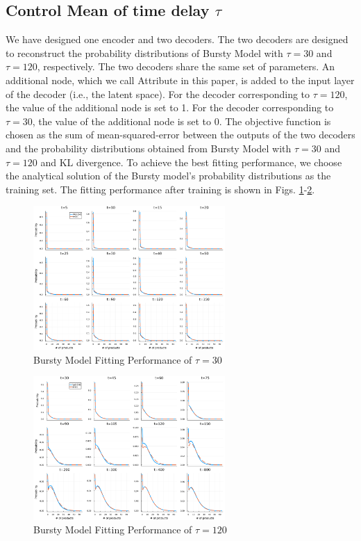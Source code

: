 \documentclass[a4paper,10pt]{article}
\begin{document}
\subsection{Control Mean of time delay $\tau$}
We have designed one encoder and two decoders. The two decoders are designed to reconstruct the probability distributions of Bursty Model with $\tau=30$ and $\tau=120$, respectively. The two decoders share the same set of parameters. An additional node, which we call Attribute in this paper, is added to the input layer of the decoder (i.e., the latent space). For the decoder corresponding to $\tau=120$, the value of the additional node is set to 1. For the decoder corresponding to $\tau=30$, the value of the additional node is set to 0. The objective  function  is chosen as the sum of mean-squared-error between the outputs of the two decoders and the probability distributions obtained from Bursty Model with $\tau=30$ and $\tau=120$ and KL divergence. To achieve the best fitting performance, we choose the analytical solution of the Bursty model’s probability distributions as the training set. The fitting performance after training is shown in Figs. \ref{Bursty_fitting_tau=30}-\ref{Bursty_fitting_tau=120}.
\begin{figure}[h]
	\centering
	\includegraphics[width=0.65\textwidth]{Figs/Bursty_fitting_tau=30.pdf}
	\caption{Bursty Model Fitting Performance of $\tau=30$}\label{Bursty_fitting_tau=30}  
\end{figure}
\begin{figure}[h]
	\centering
	\includegraphics[width=0.65\textwidth]{Figs/Bursty_fitting_tau=120.pdf}
	\caption{Bursty Model Fitting Performance of $\tau=120$}\label{Bursty_fitting_tau=120}  
\end{figure}
\end{document}
